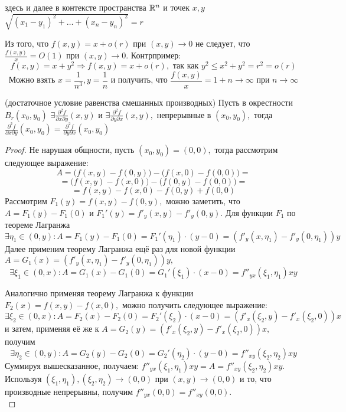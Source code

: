 
здесь и далее в контексте пространства $\mathbb{R}^n$ и точек $x, y$ $\sqrt{(x_1 - y_1)^2 + \ldots + (x_n - y_n)^2} =  r$

\begin{remark}
	Из того, что $f(x, y) = x + o(r)$ при $(x, y) \to 0$ не следует, что $\frac{f(x, y)}{x} = O(1)$ при $(x, y) \to 0$. Контрпример:
	\[ f(x,y) = x + y^2 \Rightarrow f(x, y) = x + o(r), \text{ так как } y^2 \le x^2 + y^2 = r^2 = o(r) \]
	\[ \text{Можно взять } x = \frac{1}{n^3}, y = \frac{1}{n}\text{ и получить, что } \frac{f(x, y)}{x} = 1 + n \to \infty \text{ при } n \to \infty \]
\end{remark}

\begin{theorem} (достаточное условие равенства смешанных производных) 
	Пусть  в окрестности $B_r(x_0, y_0)$ $\exists \frac{\partial^2f}{\partial x \partial y} (x, y)$  и $\exists \frac{\partial^2f}{\partial y \partial x} (x, y),$ непрерывные в $(x_0, y_0),$ тогда $\frac{\partial^2f}{\partial x \partial y} (x_0, y_0) = \frac{\partial^2f}{\partial y \partial x} (x_0, y_0)$\\
\begin{proof}
	Не нарушая общности, пусть $(x_0, y_0) = (0, 0),$ тогда рассмотрим следующее выражение:
	\[ A = \Big(f(x, y) - f(0, y)\Big) - \Big(f(x, 0) - f(0, 0)\Big) = \]
	\[ = \Big(f(x, y) - f(x, 0)\Big) - \Big(f(0, y) - f(0, 0)\Big) =\]
	\[ = f(x, y) - f(x, 0) - f(0, y) + f(0, 0) \]
	Рассмотрим $F_1(y) = f(x, y) - f(0, y),$ можно заметить, что $A = F_1(y) - F_1(0)$ и $F_1'(y) = f'_y(x, y) - f'_y(0, y)$. Для функции $F_1$ по теореме Лагранжа 
		\[ \exists \eta_1 \in (0, y) : A = F_1(y) - F_1(0) = F_1'(\eta_1) \cdot (y - 0) = (f'_y(x, \eta_1) - f'_y(0, \eta_1)) y  \]
	Далее применим теорему Лагранжа ещё раз для новой функции $A = G_1(x) = (f'_y(x, \eta_1) - f'_y(0, \eta_1)) y,$
		\[ \exists \xi_1 \in (0, x) :  A = G_1(x) - G_1(0) = G_1'(\xi_1) \cdot (x - 0) = f''_{yx}(\xi_1, \eta_1) xy  \]

	Аналогично применяя теорему Лагранжа к функции $F_2(x) = f(x, y) - f(x, 0),$ можно получить следующее выражение:
		\[ \exists \xi_2 \in (0, x) : A = F_2(x) - F_2(0) = F_2'(\xi_2) \cdot (x - 0) = (f'_x(\xi_2, y) - f'_x(\xi_2, 0)) x  \]
	и затем, применяя её же к $A = G_2(y) = (f'_x(\xi_2, y) - f'_x(\xi_2, 0)) x,$ получим
		\[ \exists \eta_2 \in (0, y) :  A = G_2(y) - G_2(0) = G_2'(\eta_2) \cdot (y - 0) = f''_{xy}(\xi_2, \eta_2) xy  \]
	Суммируя вышесказанное, получаем: $f''_{yx}(\xi_1, \eta_1) xy = A = f''_{xy}(\xi_2, \eta_2) xy.$ Используя $(\xi_1, \eta_1), (\xi_2, \eta_2) \to (0, 0)$ при $(x, y) \to (0, 0)$ и то, что производные непрерывны, получим $f''_{yx}(0, 0) = f''_{xy}(0, 0).$\\
\end{proof}
\end{theorem}

